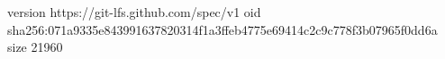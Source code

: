 version https://git-lfs.github.com/spec/v1
oid sha256:071a9335e843991637820314f1a3ffeb4775e69414c2c9c778f3b07965f0dd6a
size 21960
